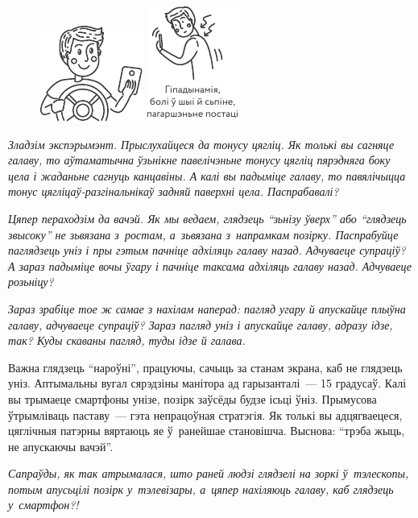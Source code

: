 \begin{figure}[htb!]
  \centering
  \includegraphics[scale=1.5]{willpower/ch13/4.pdf}\qquad
  \includegraphics[scale=1.5]{willpower/ch13/5.pdf}
\end{figure}

\emph{Зладзім экспэрымэнт. Прыслухайцеся да тонусу цягліц. Як толькі вы сагняце галаву, то аўтаматычна ўзьнікне павелічэньне тонусу цягліц пярэдняга боку цела і жаданьне сагнуць канцавіны. А калі вы падыміце галаву, то павялічыцца тонус цягліцаў-разгінальнікаў задняй паверхні цела. Паспрабавалі?}

\emph{Цяпер пераходзім да вачэй. Як мы ведаем, глядзець ``зьнізу ўверх'' або ``глядзець звысоку'' не зьвязана з~ростам, а~зьвязана з~напрамкам позірку. Паспрабуйце паглядзець уніз і пры гэтым пачніце адхіляць галаву назад. Адчуваеце супраціў? А зараз падыміце вочы ўгару і пачніце таксама адхіляць галаву назад. Адчуваеце розьніцу?}

\emph{Зараз зрабіце тое ж самае з нахілам наперад: пагляд угару й апускайце плыўна галаву, адчуваеце супраціў? Зараз пагляд уніз і апускайце галаву, адразу ідзе, так? Куды скаваны пагляд, туды ідзе й галава.}

Важна глядзець ``нароўні'', працуючы, сачыць за станам экрана, каб не глядзець уніз. Аптымальны вугал сярэдзіны манітора ад гарызанталі~--- 15 градусаў. Калі вы трымаеце смартфоны унізе, позірк заўсёды будзе ісьці ўніз. Прымусова ўтрымліваць паставу~--- гэта непрацоўная стратэгія. Як толькі вы адцягваецеся, цяглічныя патэрны вяртаюць яе ў~ранейшае становішча. Выснова: ``трэба жыць, не апускаючы вачэй''.

\emph{Сапраўды, як так атрымалася, што раней людзі глядзелі на зоркі ў~тэлескопы, потым апусьцілі позірк у~тэлевізары, а~цяпер нахіляюць галаву, каб глядзець у~смартфон?!}

